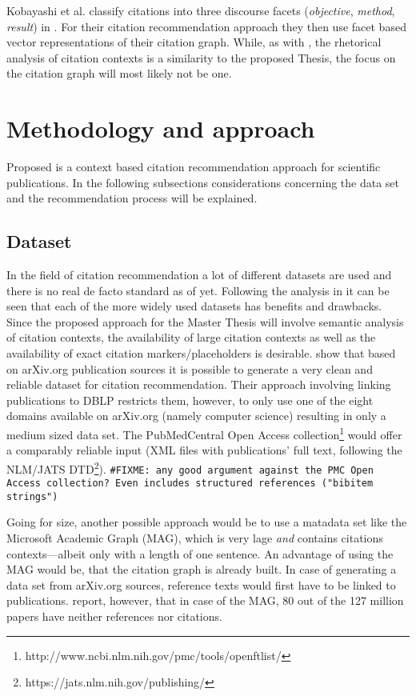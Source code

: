 \documentclass{proseminar}
\begin{document}
Kobayashi et al. classify citations into three discourse facets (\emph{objective}, \emph{method}, \emph{result}) in \cite{Kobayashi2018}. For their citation recommendation approach they then use facet based vector representations of their citation graph. While, as with \cite{Duma2016}, the rhetorical analysis of citation contexts is a similarity to the proposed Thesis, the focus on the citation graph will most likely not be one.

\section{Methodology and approach}\label{meth}
Proposed is a context based citation recommendation approach for scientific publications. In the following subsections considerations concerning the data set and the recommendation process will be explained.

\subsection{Dataset}
In the field of citation recommendation a lot of different datasets are used and there is no real de facto standard as of yet. Following the analysis in \cite{Faerber} it can be seen that each of the more widely used datasets has benefits and drawbacks. Since the proposed approach for the Master Thesis will involve semantic analysis of citation contexts, the availability of large citation contexts as well as the availability of exact citation markers/placeholders is desirable. \cite{Faerber2018} show that based on arXiv.org publication sources it is possible to generate a very clean and reliable dataset for citation recommendation. Their approach involving linking publications to DBLP restricts them, however, to only use one of the eight domains available on arXiv.org (namely computer science) resulting in only a medium sized data set. The PubMedCentral Open Access collection\footnote{http://www.ncbi.nlm.nih.gov/pmc/tools/openftlist/} would offer a comparably reliable input (XML files with publications' full text, following the NLM/JATS DTD\footnote{https://jats.nlm.nih.gov/publishing/}). \texttt{\#FIXME: any good argument against the PMC Open Access collection? Even in\-clu\-des structured references ("bibitem strings")}

Going for size, another possible approach would be to use a matadata set like the Microsoft Academic Graph\cite{Sinha2015} (MAG), which is very lage \emph{and} contains citations contexts---albeit only with a length of one sentence. An advantage of using the MAG would be, that the citation graph is already built. In case of generating a data set from arXiv.org sources, reference texts would first have to be linked to publications. \cite{Herrmannova2016} report, however, that in case of the MAG, 80 out of the 127 million papers have neither references nor citations.
\end{document}

